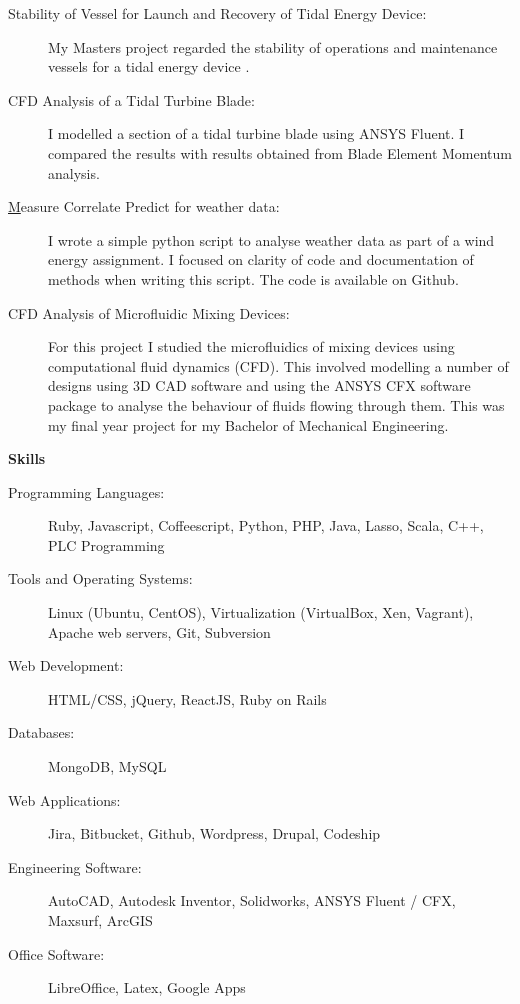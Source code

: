 \documentclass[letterpaper,11pt]{article}
\newcommand{\resheading}[1]{{\large \colorbox{mygrey}{\begin{minipage}{\textwidth}{\textbf{#1 \vphantom{p\^{E}}}}\end{minipage}}}}
\begin{document}
\begin{description}
\item[Stability of Vessel for Launch and Recovery of Tidal Energy Device:] {My Masters project regarded the stability of operations and maintenance vessels for a tidal energy device
.}

\item[CFD Analysis of a Tidal Turbine Blade:] {I modelled a section of a tidal turbine blade using ANSYS Fluent. I compared the results with results obtained from Blade Element Momentum analysis.}

\item[{\href{https://github.com/peteretep/measure-correlate-predict}Measure Correlate Predict for weather data}:] { I wrote a simple python script to analyse weather data as part of a wind energy assignment. I focused on clarity of code and documentation of methods when writing this script. The code is available on Github.}

\item[CFD Analysis of Microfluidic Mixing Devices:] { For this project I studied the microfluidics of mixing devices using computational fluid dynamics (CFD). This involved modelling a number of designs using 3D CAD software and using the ANSYS CFX software package to analyse the behaviour of fluids flowing through them. This was my final year project for my Bachelor of Mechanical Engineering. }

\end{description}



\resheading{Skills}
	\begin{description}
    \item[Programming Languages:] { \footnotesize Ruby, Javascript, Coffeescript, Python, PHP, Java, Lasso, Scala, C++, PLC Programming}
    \item[Tools and Operating Systems:] { \footnotesize Linux (Ubuntu, CentOS), Virtualization (VirtualBox, Xen, Vagrant), Apache web servers, Git, Subversion
    }
    \item[Web Development:] {\footnotesize HTML/CSS, jQuery, ReactJS, Ruby on Rails }
    \item[Databases:] {\footnotesize MongoDB, MySQL}
    \item[Web Applications:] {\footnotesize Jira, Bitbucket, Github, Wordpress, Drupal, Codeship}
    \item[Engineering Software:]{\footnotesize AutoCAD, Autodesk Inventor, Solidworks, ANSYS Fluent / CFX, Maxsurf, ArcGIS}
    \item[Office Software:]{\footnotesize LibreOffice, Latex, Google Apps} 
	\end{description} %
\end{document}
